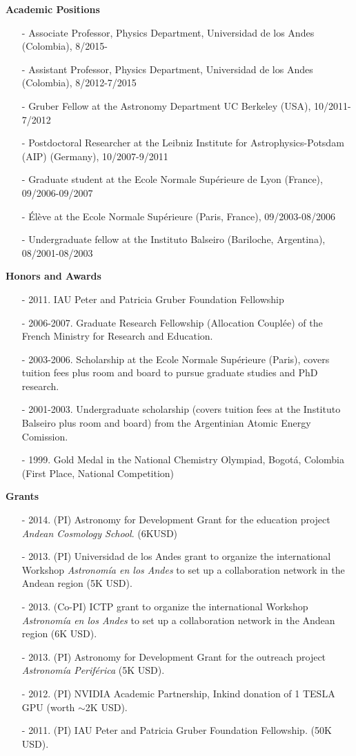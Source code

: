 \documentclass[letterpaper,11pt,onecolumn]{article}
\begin{document}
{\bf Academic Positions}
\begin{itemize}
\item[-] Associate Professor, Physics Department, Universidad de los Andes (Colombia), 8/2015-
\item[-] Assistant Professor, Physics Department, Universidad de los Andes (Colombia), 8/2012-7/2015
\item[-] Gruber Fellow at the Astronomy Department UC Berkeley (USA), 10/2011-7/2012
\item[-] Postdoctoral Researcher at the Leibniz Institute for
  Astrophysics-Potsdam (AIP) (Germany), 10/2007-9/2011  
\item[-] Graduate student at the Ecole Normale Sup\'erieure de Lyon
  (France), 09/2006-09/2007  
\item[-] \'El\`eve at the Ecole Normale Sup\'erieure (Paris, France),
  09/2003-08/2006 
\item[-] Undergraduate fellow at the Instituto Balseiro (Bariloche,
  Argentina), 08/2001-08/2003 
\end{itemize}

\newpage
{\bf Honors and Awards}
\begin{itemize}
\item[-] 2011. IAU Peter and Patricia Gruber Foundation Fellowship
\item[-] 2006-2007. Graduate Research Fellowship (Allocation Coupl\'ee) of the French
  Ministry for Research and Education.
\item[-] 2003-2006. Scholarship at the Ecole Normale Sup\'erieure (Paris), covers tuition fees plus room and
  board to pursue graduate studies and PhD research.
\item[-] 2001-2003. Undergraduate scholarship (covers tuition fees at the
  Instituto Balseiro plus room and board) from the Argentinian Atomic Energy
  Comission.
\item[-] 1999. Gold Medal in the National Chemistry Olympiad, Bogot\'a,
  Colombia (First Place, National Competition)
\end{itemize}

{\bf Grants}
\begin{itemize}
\item[-] 2014. (PI) Astronomy for Development Grant for the education
  project \emph{Andean Cosmology School}. (6KUSD)
\item[-] 2013. (PI) Universidad de los Andes grant to organize the
  international Workshop \emph{Astronom\'ia en los Andes} to set up a
  collaboration network in the Andean region (5K USD). 
\item[-] 2013. (Co-PI) ICTP grant to organize the international
  Workshop \emph{Astronom\'ia en los Andes} to set up a collaboration
  network in the Andean region (6K USD). 
\item[-] 2013. (PI) Astronomy for Development Grant for the outreach
  project \emph{Astronom\'ia Perif\'erica} (5K USD). 
\item[-] 2012. (PI) NVIDIA Academic Partnership, Inkind donation of 1
  TESLA GPU (worth $\sim$2K USD). 
\item[-] 2011. (PI) IAU Peter and Patricia Gruber Foundation
  Fellowship. (50K USD).
\end{itemize}
\end{document}
